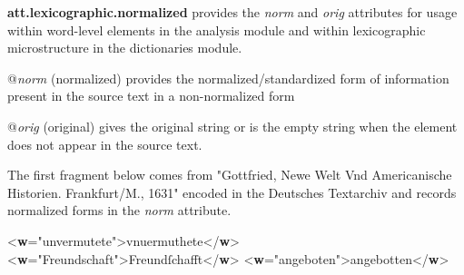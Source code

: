 \begin{sansreflist}
  
\item [\textbf{att.lexicographic.normalized}] provides the {\itshape norm} and {\itshape orig} attributes for usage within word-level elements in the analysis module and within lexicographic microstructure in the dictionaries module.\hfil\\[-10pt]\begin{sansreflist}
    \item[@{\itshape norm}]
  (normalized) provides the normalized/standardized form of information present in the source text in a non-normalized form
    \item[@{\itshape orig}]
  (original) gives the original string or is the empty string when the element does not appear in the source text.
\end{sansreflist}  
\end{sansreflist}
\par
The first fragment below comes from "Gottfried, Newe Welt Vnd Americanische Historien. Frankfurt/M., 1631" encoded in the Deutsches Textarchiv and records normalized forms in the {\itshape norm} attribute. \par\bgroup{}\exampleFont \begin{shaded}\noindent\mbox{}{<\textbf{w}\hspace*{1em}{norm}="{unvermutete}">}vnuermuthete{</\textbf{w}>}\mbox{}\newline 
{<\textbf{w}\hspace*{1em}{norm}="{Freundschaft}">}Freundſchafft{</\textbf{w}>}\mbox{}\newline 
{<\textbf{w}\hspace*{1em}{norm}="{angeboten}">}angebotten{</\textbf{w}>}\end{shaded}\egroup\par \par
